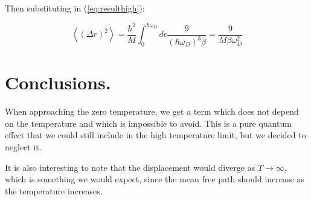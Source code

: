 \documentclass[a4paper,12pt]{article}
\begin{document}
Then substituting in (\ref{eq:resulthigh}): 

\begin{equation} 
\left\langle ( \Delta r ) ^ { 2 } \right\rangle = \frac { \hbar ^ { 2 } } {  M } \int _ { 0 } ^ { \hbar \omega_{D}} d \epsilon  \frac{9}{(\hbar \omega_{D})^3 \beta} = \frac{9}{M \beta \omega_{D}^2}
\end{equation}

\section{Conclusions.}

When approaching the zero temperature, we get a term which does not depend on the temperature and which is impossible to avoid. This is a pure quantum effect that we could still include in the high temperature limit, but we decided to neglect it. 

It is also interesting to note that the displacement would diverge as $T \to \infty$, which is something we would expect, since the mean free path should increase as the temperature increases.
\end{document}
